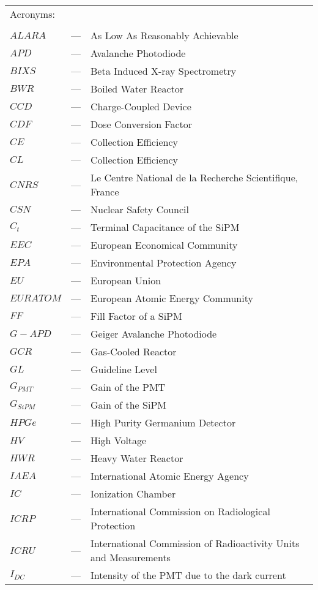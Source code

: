 \begin{longtable}{p{25mm} c p{120mm} }
\multicolumn{3}{l}{Acronyms:}\\
\\
$ALARA$ & --- & As Low As Reasonably Achievable\\
$APD$ & --- & Avalanche Photodiode\\
$BIXS$ & --- & Beta Induced X-ray Spectrometry\\
$BWR$ & --- & Boiled Water Reactor\\
$CCD$ & --- & Charge-Coupled Device\\
$CDF$ & --- & Dose Conversion Factor\\
$CE$ & --- & Collection Efficiency\\
$CL$ & --- & Collection Efficiency\\
$CNRS$ & --- & Le Centre National de la Recherche Scientifique, France\\
$CSN$ & --- & Nuclear Safety Council\\
$C_t$ & --- & Terminal Capacitance of the SiPM\\
$EEC$ & --- & European Economical Community\\
$EPA$ & --- & Environmental Protection Agency\\
$EU$ & --- & European Union\\
$EURATOM$ & --- & European Atomic Energy Community\\
$FF$ & --- & Fill Factor of a SiPM\\
$G-APD$ & --- & Geiger Avalanche Photodiode\\
$GCR$ & --- & Gas-Cooled Reactor\\
$GL$ & --- & Guideline Level\\
$G_{PMT}$ & --- & Gain of the PMT\\
$G_{SiPM}$ & --- & Gain of the SiPM\\
$HPGe$ & --- & High Purity Germanium Detector\\
$HV$ & --- & High Voltage\\
$HWR$ & --- & Heavy Water Reactor\\
$IAEA$ & --- & International Atomic Energy Agency \\
$IC$ & --- & Ionization Chamber\\
$ICRP$ & --- & International Commission on Radiological Protection \\
$ICRU$ & --- & International Commission of Radioactivity Units and Measurements\\
$I_{DC}$ & --- & Intensity of the PMT due to the dark current\\

\end{longtable}
